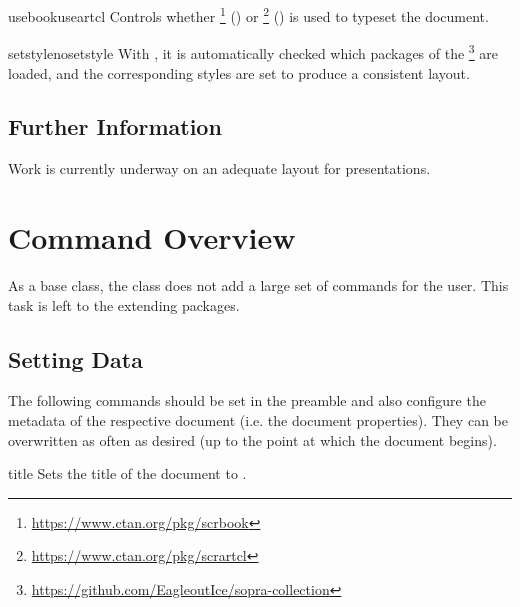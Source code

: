 \documentclass[useartcl,notoc]{sopra-paper}
\begin{document}
    \begin{argument}{usebook}{useartcl}
        Controls whether \footnote{\url{https://www.ctan.org/pkg/scrbook}} () or \footnote{\url{https://www.ctan.org/pkg/scrartcl}} () is used to typeset the document. 
    \end{argument}

    \begin{argument}{setstyle}{nosetstyle}
        With , it is automatically checked which packages of the \footnote{\url{https://github.com/EagleoutIce/sopra-collection}} are loaded, and the corresponding styles are set to produce a consistent layout.
    \end{argument}

    \subsection{Further Information}
    Work is currently underway on an adequate layout for presentations.

\section{Command Overview}

As a base class, the class does not add a large set of commands for
the user. This task is left to the extending packages.

\subsection{Setting Data}
\label{sec:DatenSetzen}
The following commands should be set in the preamble and also configure
the metadata of the respective document (i.e. the document properties).
They can be overwritten as often as desired (up to the point at which
the document begins). 

\begin{command}{title}{}
    Sets the title of the document to .
\end{command}
\end{document}
